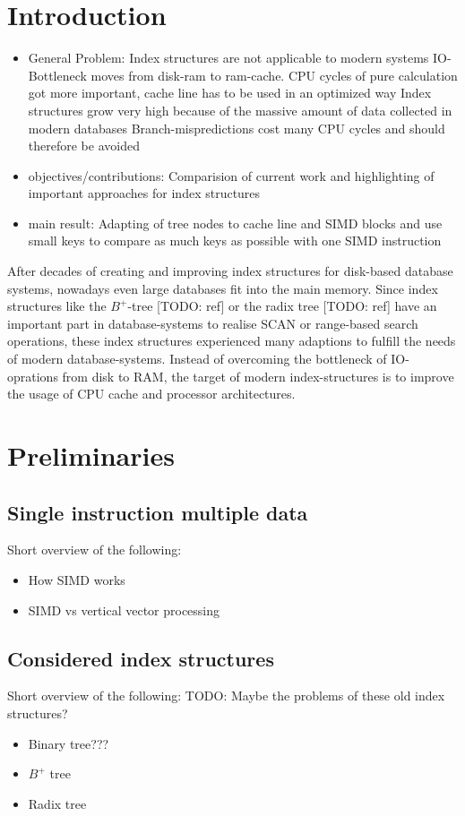 \documentclass[conference]{IEEEtran}
\begin{document}
\section{Introduction}
\begin{itemize}
	\item General Problem: Index structures are not applicable to modern systems
	\subitem IO-Bottleneck moves from disk-ram  to ram-cache. CPU cycles of pure calculation got more important, cache line has to be used in an optimized way
	\subitem Index structures grow very high because of the massive amount of data collected in modern databases
	\subitem Branch-mispredictions cost many CPU cycles and should therefore be avoided
	\item objectives/contributions: Comparision of current work and highlighting of important approaches for index structures
	\item main result: Adapting of tree nodes to cache line and SIMD blocks and use small keys to compare as much keys as possible with one SIMD instruction

\end{itemize}
After decades of creating and improving index structures for disk-based database systems, nowadays even large databases fit into the main memory. Since index structures like the $B^+$-tree [TODO: ref] or the radix tree [TODO: ref] have an important part in database-systems to realise SCAN or range-based search operations, these index structures experienced many adaptions to fulfill the needs of modern database-systems. Instead of overcoming the bottleneck of IO-oprations from disk to RAM, the target of modern index-structures is to improve the usage of CPU cache and processor architectures.



\section{Preliminaries}

\subsection{Single instruction multiple data}\label{SCM}
Short overview of the following:
\begin{itemize}
	\item How SIMD works
	\item SIMD vs vertical vector processing
\end{itemize}
\subsection{Considered index structures}\label{SCM}
Short overview of the following: TODO: Maybe the problems of these old index structures?
\begin{itemize}
	\item Binary tree???
	\item $B^{+}$ tree
	\item Radix tree
\end{itemize}
\end{document}

